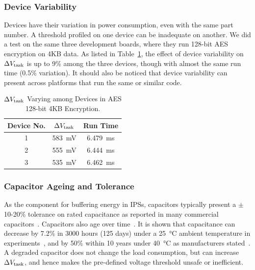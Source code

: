 \subsubsection{Device Variability}

Devices have their variation in power consumption, even with the same part number. 
A threshold profiled on one device can be inadequate on another. 
We did a test on the same three development boards, where they run 128-bit AES encryption on 4KB data. 
As listed in Table~\ref{tab:device}, the effect of device variability on $\Delta V_{\text{task}}$ is up to 9\% among the three devices, though with almost the same run time (0.5\% variation). 
It should also be noticed that device variability can present across platforms that run the same or similar code. 

\begin{table}
    \renewcommand{\arraystretch}{1.2}
    \centering
    \begin{tabular}{|c|c|c|}
    \hline
    \textbf{Device No.} & \textbf{$\Delta V_{\text{task}}$} & \textbf{Run Time} \\
    \hline
    1 & \SI{583}{\milli\volt} & \SI{6.479}{\milli\second} \\
    2 & \SI{555}{\milli\volt} & \SI{6.444}{\milli\second} \\
    3 & \SI{535}{\milli\volt} & \SI{6.462}{\milli\second} \\
    \hline
    \end{tabular}
    \caption{$\Delta V_{\text{task}}$ Varying among Devices in AES 128-bit 4KB Encryption.}
    \label{tab:device}
\end{table}

\subsubsection{Capacitor Ageing and Tolerance}
\label{subsubsec:capacitance_variability}

As the component for buffering energy in IPSs, capacitors typically present a $\pm$10-20\% tolerance on rated capacitance as reported in many commercial capacitors~\cite{tancap1, tancap2, tancap3, alcapacitor}. 
Capacitors also age over time~\cite{teverovsky2014insulation}. 
It is shown that capacitance can decrease by 7.2\% in 3000 hours (125 days) under a \SI{25}{\celsius} ambient temperature in experiments~\cite{kulkarni2010experimental}, and by 50\% within 10 years under \SI{40}{\celsius} as manufacturers stated~\cite{vishaycapacitor}.
A degraded capacitor does not change the load consumption, but can increase $\Delta V_{\text{task}}$, and hence makes the pre-defined voltage threshold unsafe or inefficient. 


